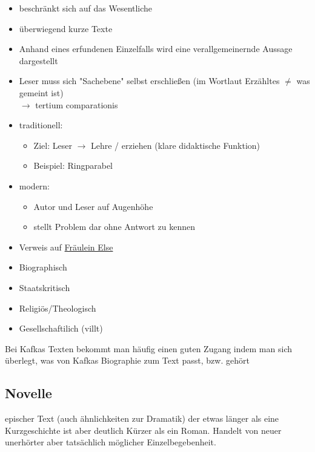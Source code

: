 \begin{itemize}
    \item beschränkt sich auf das Wesentliche
    \item überwiegend kurze Texte
    \item Anhand eines erfundenen Einzelfalls wird eine verallgemeinernde Aussage dargestellt
    \item Leser muss sich "Sachebene" selbst erschließen (im Wortlaut Erzähltes $\neq$ was gemeint ist) \\
    $\rightarrow$ tertium comparationis
    \item traditionell:
    \begin{itemize}
        \item Ziel: Leser $\rightarrow$ Lehre / erziehen (klare didaktische Funktion)
        \item Beispiel: Ringparabel
    \end{itemize}
    \item modern:
    \begin{itemize}
        \item Autor und Leser auf Augenhöhe
        \item stellt Problem dar ohne Antwort zu kennen
    \end{itemize}
    \item Verweis auf \hyperref[sec:frauleinelse]{Fräulein Else}
\end{itemize}

\begin{itemize}
    \item Biographisch
    \item Staatskritisch
    \item Religiös/Theologisch
    \item Gesellschaftilich (villt)
\end{itemize}

 Bei Kafkas Texten bekommt man häufig einen guten Zugang indem man sich überlegt, was von Kafkas Biographie zum Text passt, bzw. gehört


\subsection{Novelle}

 epischer Text (auch ähnlichkeiten zur Dramatik) der etwas länger als eine Kurzgeschichte ist aber deutlich Kürzer als ein Roman. Handelt von neuer unerhörter aber tatsächlich möglicher Einzelbegebenheit.

